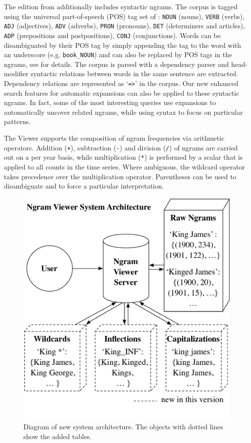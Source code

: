 \documentclass[11pt,a4paper]{article}
\newcommand{\query}[1]{\texttt{#1}}
\begin{document}
The edition from  additionally includes syntactic ngrams. The corpus is tagged using the universal part-of-speech (POS) tag set of : \query{NOUN} (nouns), \query{VERB} (verbs), \query{ADJ} (adjectives), \query{ADV} (adverbs), \query{PRON} (pronouns), \query{DET} (determiners and articles), \query{ADP} (prepositions and postpositions), \query{CONJ} (conjunctions). Words can be disambiguated by their POS tag by simply appending the tag to the word with an underscore (e.g. \texttt{book\_NOUN}) and can also be replaced by POS tags in the ngrams, see  for details. The corpus is  parsed with a dependency parser and head-modifier syntactic relations between words in the same sentence are extracted. Dependency relations are represented as `\query{=>}' in the corpus. Our new enhanced search features for automatic expansions can also be applied to these syntactic ngrams. In fact, some of the most interesting queries use expansions to automatically uncover related ngrams, while using syntax to focus on particular patterns.

The Viewer supports the composition of ngram frequencies via arithmetic operators. Addition (\query{+}), subtraction (\query{-}) and division (\query{/}) of ngrams are carried out on a per year basis, while multiplication (\query{*}) is performed by a scalar that is applied to all counts in the time series. Where ambiguous, the wildcard operator takes precedence over the multiplication operator. Parentheses can be used to disambiguate and to force a particular interpretation.

\begin{figure}[!t]
\includegraphics[width=\columnwidth,keepaspectratio=true]{system_architecture}
\caption{\label{fig:architecture}Diagram of new system architecture. The objects with dotted lines show the added tables.}
\end{figure}
\end{document}
